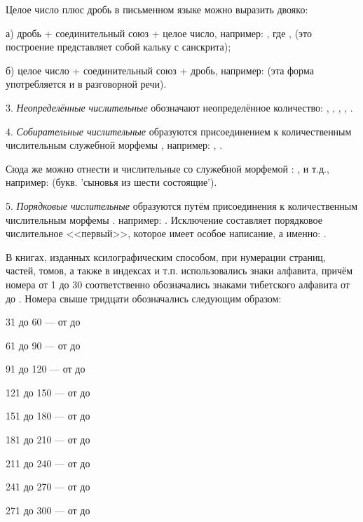Целое число плюс дробь в письменном языке можно выразить двояко:
\begin{description}
    \item а) дробь + соединительный союз  + целое число, например:
    , где	,  (это построение представляет собой кальку с санскрита);
    \item б) целое число + соединительный союз + дробь, например:  (эта форма употребляется и в разговорной речи).
\end{description}

3. \emph{Неопределённые числительные} обозначают неопределённое количество:
,
,
,
, .

4. \emph{Собирательные числительные} образуются присоединением к количественным числительным служебной морфемы , например: , .

Сюда же можно отнести и числительные со служебной морфемой :
,
 и т.д., например:
 (букв. 'сыновья из шести состоящие').

5. \emph{Порядковые числительные} образуются путём присоединения к количественным числительным морфемы . например: . Исключение составляет порядковое числительное <<первый>>, которое имеет особое написание, а именно: .

В книгах, изданных ксилографическим способом, при нумерации страниц, частей, томов, а также в индексах и т.п. использовались знаки алфавита, причём номера от 1 до 30 соответственно обозначались знаками тибетского алфавита от  до . Номера свыше тридцати обозначались следующим образом:
\begin{description}
    \item 31 до 60 --- от  до 
    \item 61 до 90 --- от  до 
    \item 91 до 120 --- от  до 
    \item 121 до 150 --- от  до 
    \item 151 до 180 --- от	 до 
    \item 181 до 210 --- от	 до 
    \item 211 до 240 --- от  до 
    \item 241 до 270 --- от  до 
    \item 271 до 300 --- от  до 
\end{description}

